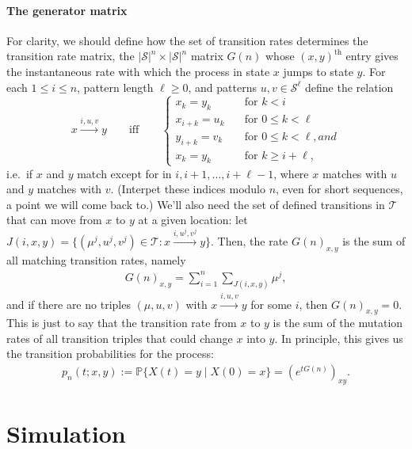 \documentclass{article}
\renewcommand{\P}{\mathbb{P}}
\newcommand{\calS}{\mathcal{S}}  %
\newcommand{\calT}{\mathcal{T}}  %
\newcommand{\st}{\colon}  %
\theoremstyle{plain}
\theoremstyle{definition}
\begin{document}
\paragraph{The generator matrix}
For clarity, we should define how the set of transition rates determines the transition rate matrix,
the $|\calS|^n \times |\calS|^n$ matrix $G(n)$ whose $(x,y)^\text{th}$ entry gives the instantaneous rate 
with which the process in state $x$ jumps to state $y$.
For each $1\le i \le n$, pattern length $\ell \ge 0$, and patterns $u,v \in \calS^\ell$ define the relation
\[
x \xrightarrow{i,u,v} y \qquad \text{iff} \qquad \begin{cases}
  x_k = y_k \quad &\text{for } k<i \\
  x_{i+k} = u_k \quad &\text{for } 0 \le k < \ell \\
  y_{i+k} = v_k \quad &\text{for } 0 \le k < \ell, and \\
  x_k = y_k \quad &\text{for } k\ge i+\ell ,
\end{cases}
\]
i.e.\ if $x$ and $y$ match except for in $i,i+1,\ldots,i+\ell-1$, where $x$ matches with $u$ and $y$ matches with $v$.
(Interpet these indices modulo $n$, even for short sequences, a point we will come back to.)
We'll also need the set of defined transitions in $\calT$ 
that can move from $x$ to $y$ at a given location: let  $J(i,x,y) = \{ (\mu^j,u^j,v^j) \in \calT \st x \xrightarrow{i,u^j,v^j} y \}$.
Then, the rate $G(n)_{x,y}$ is the sum of all matching transition rates,
namely
\begin{align} \label{eqn:G_defn}
  G(n)_{x,y} = \sum_{i=1}^n \sum_{J(i,x,y)}  \mu^j ,
\end{align}
and if there are no triples $(\mu,u,v)$ with $x \xrightarrow{i,u,v} y$ for some $i$, then $G(n)_{x,y}=0$.
This is just to say that the transition rate from $x$ to $y$ is the sum of the mutation rates of all transition triples
that could change $x$ into $y$.
In principle, this gives us the transition probabilities for the process:
\begin{align} \label{eqn:full_likelihood}
    p_n(t;x,y) := \P\{ X(t) = y \mid X(0) = x \} = (e^{tG(n)})_{xy} .
\end{align}


\section{Simulation}
\end{document}
